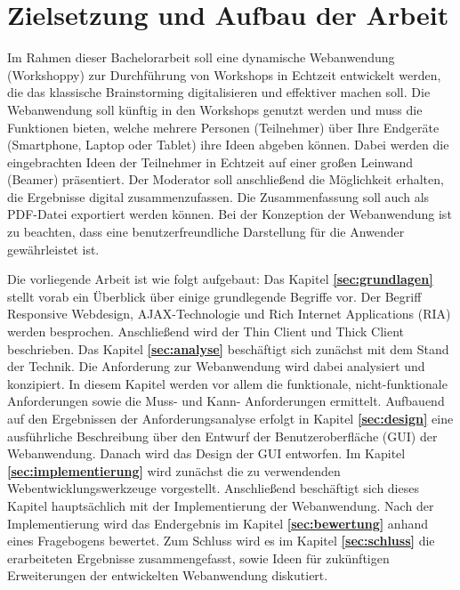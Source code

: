 \section{Zielsetzung und Aufbau der Arbeit}
\label{subsec:zielsetzung}
Im Rahmen dieser Bachelorarbeit soll eine dynamische Webanwendung (Workshoppy) zur Durchführung von Workshops in Echtzeit entwickelt werden, die das klassische Brainstorming digitalisieren und effektiver machen soll. Die Webanwendung soll künftig in den Workshops genutzt werden und muss die Funktionen bieten, welche mehrere Personen (Teilnehmer) über Ihre Endgeräte (Smartphone, Laptop oder Tablet) ihre Ideen abgeben können. Dabei werden die eingebrachten Ideen der Teilnehmer in Echtzeit auf einer großen Leinwand (Beamer) präsentiert. Der Moderator soll anschließend die Möglichkeit erhalten, die Ergebnisse digital zusammenzufassen. Die Zusammenfassung soll auch als PDF-Datei exportiert werden können. Bei der Konzeption der Webanwendung ist zu beachten, dass eine benutzerfreundliche Darstellung für die Anwender gewährleistet ist.\bigskip

Die vorliegende Arbeit ist wie folgt aufgebaut: Das Kapitel \textbf{\ref{sec:grundlagen}} stellt vorab ein Überblick über einige grundlegende Begriffe vor. Der Begriff Responsive Webdesign, AJAX-Technologie und Rich Internet Applications (RIA) werden besprochen. Anschließend wird der Thin Client und Thick Client beschrieben. Das Kapitel \textbf{\ref{sec:analyse}} beschäftigt sich zunächst mit dem Stand der Technik. Die Anforderung zur Webanwendung wird dabei analysiert und konzipiert. In diesem Kapitel werden vor allem die funktionale, nicht-funktionale Anforderungen sowie die Muss- und Kann- Anforderungen ermittelt. Aufbauend auf den Ergebnissen der Anforderungsanalyse erfolgt in Kapitel \textbf{\ref{sec:design}} eine ausführliche Beschreibung über den Entwurf der Benutzeroberfläche (GUI) der Webanwendung. Danach wird das Design der GUI entworfen. Im Kapitel \textbf{\ref{sec:implementierung}} wird zunächst die zu verwendenden Webentwicklungswerkzeuge vorgestellt. Anschließend beschäftigt sich dieses Kapitel hauptsächlich mit der Implementierung der Webanwendung. Nach der Implementierung wird das Endergebnis im Kapitel \textbf{\ref{sec:bewertung}} anhand eines Fragebogens bewertet. Zum Schluss wird es im Kapitel \textbf{\ref{sec:schluss}} die erarbeiteten Ergebnisse zusammengefasst, sowie Ideen für zukünftigen Erweiterungen der entwickelten Webanwendung diskutiert.

